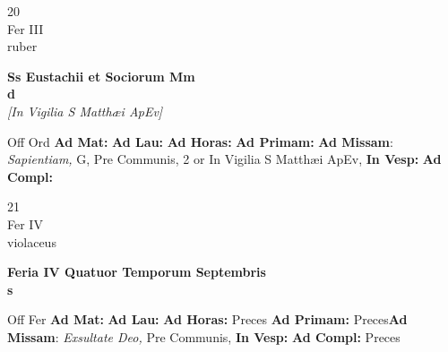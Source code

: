 \documentclass[10pt, openany]{book}
\begin{document}
        \begin{center}
            \begin{minipage}{3.5in}
                \vspace{2em}
                \begin{minipage}{0.5in}
                    {\Huge 20} \\
                    {\normalsize Fer III} \\
                    {\normalsize ruber}
                \end{minipage}
                \begin{minipage}{3.0in}
                    \textbf{ \large Ss Eustachii et Sociorum Mm \\
                    \textnormal{\normalsize d}} \\ \textit{[In Vigilia S Matthæi ApEv]} \\ 
                \end{minipage}
                \begin{justify}Off Ord
                    \textbf{Ad Mat: }
                    \textbf{Ad Lau: }
                    \textbf{Ad Horas: }
                    \textbf{Ad Primam: }\textbf{Ad Missam}: \textit{Sapientiam,} G, Pre Communis, 2 or In Vigilia S Matthæi ApEv,  
                    \textbf{In Vesp: }
                    \textbf{Ad Compl: }
                \end{justify}
            \end{minipage}
        \end{center}
    
        \begin{center}
            \begin{minipage}{3.5in}
                \vspace{2em}
                \begin{minipage}{0.5in}
                    {\Huge 21} \\
                    {\normalsize Fer IV} \\
                    {\normalsize violaceus}
                \end{minipage}
                \begin{minipage}{3.0in}
                    \textbf{ \large Feria IV Quatuor Temporum Septembris \\
                    \textnormal{\normalsize s}} \\ 
                \end{minipage}
                \begin{justify}Off Fer
                    \textbf{Ad Mat: }
                    \textbf{Ad Lau: }
                    \textbf{Ad Horas: }Preces
                    \textbf{Ad Primam: }Preces\textbf{Ad Missam}: \textit{Exsultate Deo,} Pre Communis,  
                    \textbf{In Vesp: }
                    \textbf{Ad Compl: }Preces
                \end{justify}
            \end{minipage}
        \end{center}
    
\end{document}
